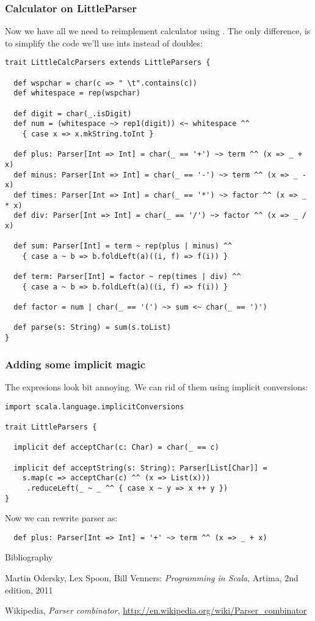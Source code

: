 \documentclass[t]{beamer}
\begin{document}
\begin{frame}[fragile]
\frametitle{Calculator on LittleParser}
Now we have all we need to reimplement calculator using .
The only difference, is to simplify the code we'll use ints instead of doubles:
\begin{lstlisting}
trait LittleCalcParsers extends LittleParsers {

  def wspchar = char(c => " \t".contains(c))
  def whitespace = rep(wspchar)

  def digit = char(_.isDigit)
  def num = (whitespace ~> rep1(digit)) <~ whitespace ^^
    { case x => x.mkString.toInt }

  def plus: Parser[Int => Int] = char(_ == '+') ~> term ^^ (x => _ + x)
  def minus: Parser[Int => Int] = char(_ == '-') ~> term ^^ (x => _ - x)
  def times: Parser[Int => Int] = char(_ == '*') ~> factor ^^ (x => _ * x)
  def div: Parser[Int => Int] = char(_ == '/') ~> factor ^^ (x => _ / x)

  def sum: Parser[Int] = term ~ rep(plus | minus) ^^
    { case a ~ b => b.foldLeft(a)((i, f) => f(i)) }

  def term: Parser[Int] = factor ~ rep(times | div) ^^
    { case a ~ b => b.foldLeft(a)((i, f) => f(i)) }

  def factor = num | char(_ == '(') ~> sum <~ char(_ == ')')

  def parse(s: String) = sum(s.toList)
}
\end{lstlisting}
\end{frame}

\begin{frame}[fragile]
\frametitle{Adding some implicit magic}
The  expresions look bit annoying.  We can rid of them
using implicit conversions:
\begin{lstlisting}
import scala.language.implicitConversions

trait LittleParsers {

  implicit def acceptChar(c: Char) = char(_ == c)

  implicit def acceptString(s: String): Parser[List[Char]] =
    s.map(c => acceptChar(c) ^^ (x => List(x)))
     .reduceLeft(_ ~ _ ^^ { case x ~ y => x ++ y })
}
\end{lstlisting}

Now we can rewrite  parser as:
\begin{lstlisting}
  def plus: Parser[Int => Int] = '+' ~> term ^^ (x => _ + x)
\end{lstlisting}
\end{frame}

\begin{frame}{Bibliography}
\begin{thebibliography}{00}
Martin Odersky, Lex Spoon, Bill Venners:
\emph{Programming in Scala},
Artima, 2nd edition, 2011

Wikipedia, \emph{Parser combinator}, \url{http://en.wikipedia.org/wiki/Parser_combinator}
\end{thebibliography}
\end{frame}


\end{document}
